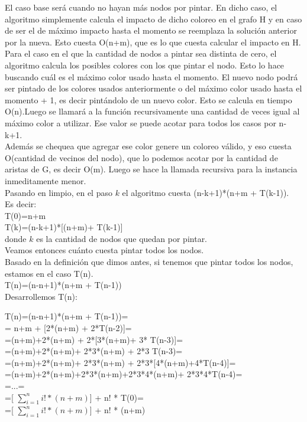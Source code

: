 \indent El caso base será cuando no hayan más nodos por pintar. En dicho caso, el algoritmo simplemente calcula el impacto de dicho coloreo en el grafo H y en caso de ser el de máximo impacto hasta el momento se reemplaza la solución anterior por la nueva. Esto cuesta O(n+m), que es lo que cuesta calcular el impacto en H.\\
\indent Para el caso en el que la cantidad de nodos a pintar sea distinta de cero, el algoritmo calcula los posibles colores con los que pintar el nodo. Esto lo hace buscando cuál es el máximo color usado hasta el momento. El nuevo nodo podrá ser pintado de los colores usados anteriormente o del máximo color usado hasta el momento + 1, es decir pintándolo de un nuevo color. Esto se calcula en tiempo O(n).Luego se llamará a la función recursivamente una cantidad de veces igual al máximo color a utilizar. Ese valor se puede acotar para todos los casos por n-k+1.\\
\indent Además se chequea que agregar ese color genere un coloreo válido, y eso cuesta O(cantidad de vecinos del nodo), que lo podemos acotar por la cantidad de aristas de G, es decir O(m). Luego se hace la llamada recursiva para la instancia inmeditamente menor.\\
\indent Pasando en limpio, en el paso $k$ el algoritmo cuesta (n-k+1)*(n+m + T(k-1)).\\
\indent Es decir:\\

\indent T(0)=n+m\\
\indent T(k)=(n-k+1)*[(n+m)+ T(k-1)]\\

donde $k$ es la cantidad de nodos que quedan por pintar.\\


\indent Veamos entonces cuánto cuesta pintar todos los nodos.\\
\indent Basado en la definición que dimos antes, si tenemos que pintar todos los nodos, estamos en el caso T(n).\\

\indent T(n)=(n-n+1)*(n+m + T(n-1))\\

\indent Desarrollemos T(n):\\


\begin{centering}
T(n)=(n-n+1)*(n+m + T(n-1))=\\
= n+m + [2*(n+m) + 2*T(n-2)]=\\
=(n+m)+2*(n+m) + 2*[3*(n+m)+ 3* T(n-3)]=\\
=(n+m)+2*(n+m)+ 2*3*(n+m) + 2*3 T(n-3)=\\
=(n+m)+2*(n+m)+ 2*3*(n+m) + 2*3*[4*(n+m)+4*T(n-4)]=\\
=(n+m)+2*(n+m)+2*3*(n+m)+2*3*4*(n+m)+ 2*3*4*T(n-4)=\\
=...=\\
=[ $\sum_{i=1}^{n} i! * (n+m) $] + n! * T(0)= \\
=[ $\sum_{i=1}^{n} i! * (n+m) $] + n! * (n+m)\\
\end{centering}


